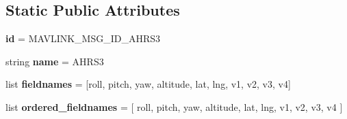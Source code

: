 \subsection*{Static Public Attributes}
\begin{DoxyCompactItemize}
\item 
\mbox{\label{classpymavlink_1_1dialects_1_1v10_1_1MAVLink__ahrs3__message_a6ebfc23dd68ad0fe3ff73dbd0f27e811}} 
{\bfseries id} = M\+A\+V\+L\+I\+N\+K\+\_\+\+M\+S\+G\+\_\+\+I\+D\+\_\+\+A\+H\+R\+S3
\item 
\mbox{\label{classpymavlink_1_1dialects_1_1v10_1_1MAVLink__ahrs3__message_a3c580d948fad955e1769e4fdccf8b81b}} 
string {\bfseries name} = \textquotesingle{}A\+H\+R\+S3\textquotesingle{}
\item 
\mbox{\label{classpymavlink_1_1dialects_1_1v10_1_1MAVLink__ahrs3__message_a7813507abf77ffdead236af2494e0f44}} 
list {\bfseries fieldnames} = \mbox{[}\textquotesingle{}roll\textquotesingle{}, \textquotesingle{}pitch\textquotesingle{}, \textquotesingle{}yaw\textquotesingle{}, \textquotesingle{}altitude\textquotesingle{}, \textquotesingle{}lat\textquotesingle{}, \textquotesingle{}lng\textquotesingle{}, \textquotesingle{}v1\textquotesingle{}, \textquotesingle{}v2\textquotesingle{}, \textquotesingle{}v3\textquotesingle{}, \textquotesingle{}v4\textquotesingle{}\mbox{]}
\item 
\mbox{\label{classpymavlink_1_1dialects_1_1v10_1_1MAVLink__ahrs3__message_a9c5245f20525192402d460d8d8244bfa}} 
list {\bfseries ordered\+\_\+fieldnames} = \mbox{[} \textquotesingle{}roll\textquotesingle{}, \textquotesingle{}pitch\textquotesingle{}, \textquotesingle{}yaw\textquotesingle{}, \textquotesingle{}altitude\textquotesingle{}, \textquotesingle{}lat\textquotesingle{}, \textquotesingle{}lng\textquotesingle{}, \textquotesingle{}v1\textquotesingle{}, \textquotesingle{}v2\textquotesingle{}, \textquotesingle{}v3\textquotesingle{}, \textquotesingle{}v4\textquotesingle{} \mbox{]}
\item 
\mbox{\label{classpymavlink_1_1dialects_1_1v10_1_1MAVLink__ahrs3__message_a086f8457de4aa42bf5f2faf5e65e0916}} 

\end{DoxyCompactItemize}
